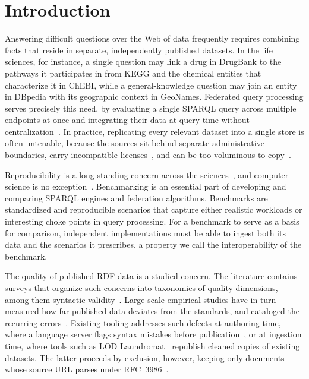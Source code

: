 \section{Introduction}
\label{sec:introduction}

Answering difficult questions over the Web of data frequently requires combining facts that reside in separate, independently published datasets.
In the life sciences, for instance, a single question may link a drug in DrugBank to the pathways it participates in from KEGG and the chemical entities that characterize it in ChEBI, while a general-knowledge question may join an entity in DBpedia with its geographic context in GeoNames.
Federated query processing serves precisely this need, by evaluating a single SPARQL query across multiple endpoints at once and integrating their data at query time without centralization~\cite{schwarte2011fedx}.
In practice, replicating every relevant dataset into a single store is often untenable, because the sources sit behind separate administrative boundaries, carry incompatible licenses~\cite{Moreau2021}, and can be too voluminous to copy~\cite{lubiana2025split}.

Reproducibility is a long-standing concern across the sciences~\cite{baker2016reproducibility}, and computer science is no exception~\cite{collberg2016repeatability}.
Benchmarking is an essential part of developing and comparing SPARQL engines and federation algorithms.
Benchmarks are standardized and reproducible scenarios that capture either realistic workloads or interesting choke points in query processing.
For a benchmark to serve as a basis for comparison, independent implementations must be able to ingest both its data and the scenarios it prescribes, a property we call the interoperability of the benchmark.

The quality of published \ac{RDF} data is a studied concern.
The literature contains surveys that organize such concerns into taxonomies of quality dimensions, among them syntactic validity~\cite{Zaveri2015}.
Large-scale empirical studies have in turn measured how far published data deviates from the standards, and cataloged the recurring errors~\cite{Hogan2010WeavingTP,hogan2012empirical}.
Existing tooling addresses such defects at authoring time, where a language server flags syntax mistakes before publication~\cite{Vercruysse2025}, or at ingestion time, where tools such as LOD Laundromat~\cite{Beek2014} republish cleaned copies of existing datasets.
The latter proceeds by exclusion, however, keeping only documents whose source URL parses under RFC~3986~\cite{ietf3986URI}.

